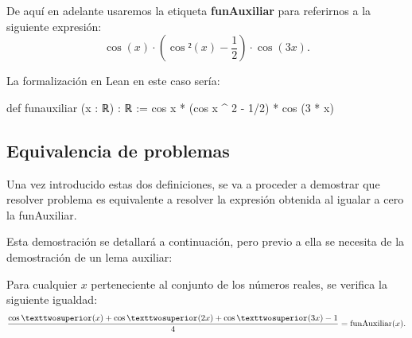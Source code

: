 \begin{definicion}\label{funaux}
  De aquí en adelante usaremos la etiqueta \textbf{funAuxiliar} para
  referirnos a la siguiente expresión:
  \begin{equation*}
    \cos(x)·\left(\cos²(x)-\frac{1}{2}\right)·\cos(3x).
  \end{equation*}
\end{definicion}

La formalización en Lean en este caso sería:
\begin{leancode}
def funauxiliar (x : ℝ) : ℝ :=
cos x * (cos x ^ 2 - 1/2) * cos (3 * x)
\end{leancode}

\subsection{Equivalencia de problemas}

Una vez introducido estas dos definiciones, se va a proceder a demostrar
que resolver problema es equivalente a resolver la expresión obtenida al
igualar a cero la funAuxiliar.

Esta demostración se detallará a continuación, pero previo a ella se
necesita de la demostración de un lema auxiliar:

\begin{lema}[Igualdad]\label{igualdadlema}
  Para cualquier \(x\) perteneciente al conjunto de los números reales,
  se verifica la siguiente igualdad:
  \begin{equation}\label{lemaigualdad}
    \frac{\cos²(x)+\cos²(2x)+\cos²(3x)-1}{4}=\funauxiliar(x).
  \end{equation}
\end{lema}

